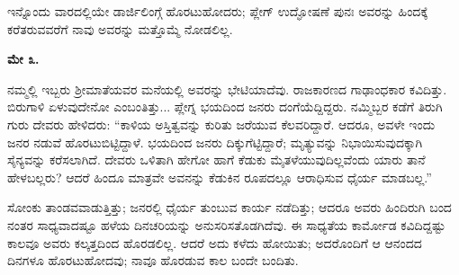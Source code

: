 ಇನ್ನೊಂದು ವಾರದಲ್ಲಿಯೇ ಡಾರ್ಜಿಲಿಂಗ್ಗೆ ಹೊರಟುಹೋದರು; ಪ್ಲೇಗ್ ಉದ್ಘೋಷಣೆ ಪುನಃ ಅವರನ್ನು ಹಿಂದಕ್ಕೆ ಕರೆತರುವವರೆಗೆ ನಾವು ಅವರನ್ನು ಮತ್ತೊಮ್ಮೆ ನೋಡಲಿಲ್ಲ.

\textbf{ಮೇ ೩.}

ನಮ್ಮಲ್ಲಿ ಇಬ್ಬರು ಶ‍್ರೀಮಾತೆಯವರ ಮನೆಯಲ್ಲಿ ಅವರನ್ನು ಭೇಟಿಯಾದೆವು. ರಾಜಕಾರಣದ ಗಾಢಾಂಧಕಾರ ಕವಿದಿತ್ತು. ಬಿರುಗಾಳಿ ಏಳುವುದೇನೋ ಎಂಬಂತಿತ್ತು... ಪ್ಲೇಗ್ನ ಭಯದಿಂದ ಜನರು ದಂಗೆಯೆದ್ದಿದ್ದರು. ನಮ್ಮಿಬ್ಬರ ಕಡೆಗೆ ತಿರುಗಿ ಗುರು ದೇವರು ಹೇಳಿದರು: “ಕಾಳಿಯ ಅಸ್ತಿತ್ವವನ್ನು ಕುರಿತು ಜರೆಯುವ ಕೆಲವರಿದ್ದಾರೆ. ಆದರೂ, ಅವಳೇ ಇಂದು ಜನರ ನಡುವೆ ಹೊರಟುಬಿಟ್ಟಿದ್ದಾಳೆ. ಭಯದಿಂದ ಜನರು ದಿಕ್ಕುಗೆಟ್ಟಿದ್ದಾರೆ; ಮೃತ್ಯುವನ್ನು ನಿಭಾಯಿಸುವುದಕ್ಕಾಗಿ ಸೈನ್ಯವನ್ನು ಕರೆಸಲಾಗಿದೆ. ದೇವರು ಒಳಿತಾಗಿ ಹೇಗೋ ಹಾಗೆ ಕೆಡುಕು ಮೈತಳೆಯುವುದಿಲ್ಲವೆಂದು ಯಾರು ತಾನೆ ಹೇಳಬಲ್ಲರು? ಆದರೆ ಹಿಂದೂ ಮಾತ್ರವೇ ಅವನನ್ನು ಕೆಡುಕಿನ ರೂಪದಲ್ಲೂ ಆರಾಧಿಸುವ ಧೈರ್ಯ ಮಾಡಬಲ್ಲ.”

ಸೋಂಕು ತಾಂಡವವಾಡುತ್ತಿತ್ತು; ಜನರಲ್ಲಿ ಧೈರ್ಯ ತುಂಬುವ ಕಾರ್ಯ ನಡೆದಿತ್ತು; ಆದರೂ ಅವರು ಹಿಂದಿರುಗಿ ಬಂದ ನಂತರ ಸಾಧ್ಯವಾದಷ್ಟೂ ಹಳೆಯ ದಿನಚರಿಯನ್ನು ಅನುಸರಿಸತೊಡಗಿದೆವು. ಈ ಸಾಧ್ಯತೆಯ ಕಾರ್ಮೋಡ ಕವಿದಿದ್ದಷ್ಟು ಕಾಲವೂ ಅವರು ಕಲ್ಕತ್ತದಿಂದ ಹೊರಡಲಿಲ್ಲ. ಆದರೆ ಅದು ಕಳೆದು ಹೋಯಿತು; ಅದರೊಂದಿಗೆ ಆ ಆನಂದದ ದಿನಗಳೂ ಹೊರಟುಹೋದವು; ನಾವೂ ಹೊರಡುವ ಕಾಲ ಬಂದೇ ಬಂದಿತು.

